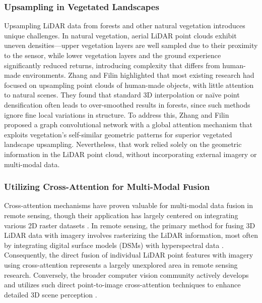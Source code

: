 \documentclass[remotesensing,article,accept,pdftex,moreauthors]{Definitions/mdpi}
\renewcommand{\hl}[1]{#1}
\begin{document}
\subsubsection{Upsampling in Vegetated Landscapes}

Upsampling LiDAR data from forests and other natural vegetation introduces unique challenges. In natural vegetation, aerial LiDAR point clouds exhibit uneven densities—upper vegetation layers are well sampled due to their proximity to the sensor, while lower vegetation layers and the ground experience significantly reduced returns, introducing complexity that differs from human-made environments. Zhang and Filin \cite{zhang2022deep} highlighted that most existing research had focused on upsampling point clouds of \hl{human-made} objects, with little attention to natural scenes. They found that standard 3D interpolation or naïve point densification often leads to over-smoothed results in forests, since such methods ignore fine local variations in structure. To address this, Zhang and Filin proposed a graph convolutional network with a global attention mechanism that exploits vegetation's self-similar geometric patterns for superior vegetated landscape upsampling. Nevertheless, that work relied solely on the geometric information in the LiDAR point cloud, without incorporating external imagery or multi-modal data.

\subsubsection{Utilizing Cross-Attention for Multi-Modal Fusion}

Cross-attention mechanisms have proven valuable for multi-modal data fusion in remote sensing, though their application has largely centered on integrating various 2D raster datasets \cite{yan2025remote, ma2022crossmodal, qingyun2022cross, li2024cross}. In remote sensing, the primary method for fusing 3D LiDAR data with imagery involves rasterizing the LiDAR information, most often by integrating digital surface models (DSMs) with hyperspectral data \cite{yu2024dmsca, li2024multi, yang2024lidar}. Consequently, the direct fusion of individual LiDAR point features with imagery using cross-attention represents a largely unexplored area in remote sensing research. Conversely, the broader computer vision community actively develops and utilizes such direct point-to-image cross-attention techniques to enhance detailed 3D scene perception \cite{zhu2024cams, yoo20203d, wu2021point}.
\end{document}

